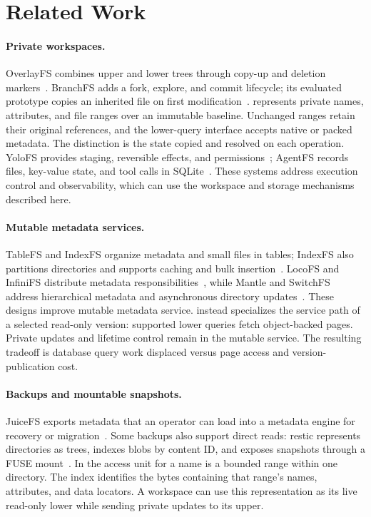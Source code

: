 \section{Related Work}
\label{sec:related}

\paragraph{Private workspaces.}
OverlayFS combines upper and lower trees through copy-up and deletion
markers~\cite{overlayfs}. BranchFS adds a fork, explore, and commit
lifecycle; its evaluated prototype copies an inherited file on first
modification~\cite{branchfs2026}. \sys represents private names,
attributes, and file ranges over an immutable baseline. Unchanged ranges
retain their original references, and the lower-query interface accepts
native or packed metadata. The distinction is the state copied and
resolved on each operation. YoloFS provides staging, reversible effects,
and permissions~\cite{yolofs2026}; AgentFS records files, key-value state,
and tool calls in SQLite~\cite{agentfs2025}. These systems address
execution control and observability, which can use the workspace and
storage mechanisms described here.

\paragraph{Mutable metadata services.}
TableFS and IndexFS organize metadata and small files in tables;
IndexFS also partitions directories and supports caching and bulk
insertion~\cite{tablefs2013,indexfs2014}. LocoFS and InfiniFS distribute
metadata responsibilities~\cite{locofs2017,infinifs2022}, while Mantle
and SwitchFS address hierarchical metadata and asynchronous directory
updates~\cite{mantle2025,switchfs2026}. These designs improve mutable
metadata service. \sys instead specializes the service path of a selected
read-only version: supported lower queries fetch object-backed pages.
Private updates and lifetime control remain in the mutable service.
The resulting tradeoff is database query work displaced versus page
access and version-publication cost.

\paragraph{Backups and mountable snapshots.}
JuiceFS exports metadata that an operator can load into a metadata
engine for recovery or migration~\cite{juicefs_backup}. Some backups
also support direct reads: restic represents directories as trees,
indexes blobs by content ID, and exposes snapshots through a FUSE
mount~\cite{restic_backup}. In \sys the access unit for a name is a
bounded range within one directory. The index identifies the bytes
containing that range's names, attributes, and data locators. A
workspace can use this representation as its live read-only lower while
sending private updates to its upper.


